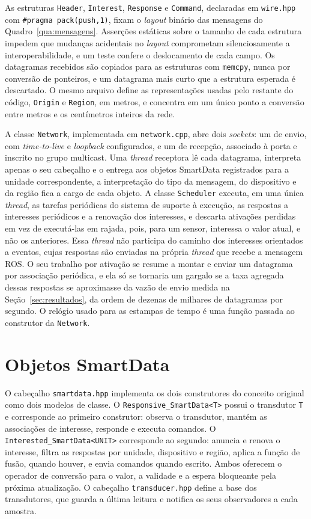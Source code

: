 \documentclass[
    12pt,
    oneside,
    a4paper,
    chapter=TITLE,
    section=TITLE,
    english,
    brazil
]{abntex2}
\begin{document}
As estruturas \texttt{Header}, \texttt{Interest}, \texttt{Response} e
\texttt{Command}, declaradas em \texttt{wire.hpp} com
\texttt{\#pragma pack(push,1)}, fixam o \textit{layout} binário das
mensagens do Quadro~\ref{qua:mensagens}. Asserções estáticas sobre o
tamanho de cada estrutura impedem que mudanças acidentais no
\textit{layout} comprometam silenciosamente a interoperabilidade, e um
teste confere o deslocamento de cada campo. Os datagramas recebidos são
copiados para as estruturas com \texttt{memcpy}, nunca por conversão de
ponteiros, e um datagrama mais curto que a estrutura esperada é descartado.
O mesmo arquivo define as representações usadas pelo restante do código,
\texttt{Origin} e \texttt{Region}, em metros, e concentra em um único
ponto a conversão entre metros e os centímetros inteiros da rede.

A classe \texttt{Network}, implementada em \texttt{network.cpp}, abre
dois \textit{sockets}: um de envio, com \textit{time-to-live} e
\textit{loopback} configurados, e um de recepção, associado à porta e
inscrito no grupo multicast. Uma \textit{thread} receptora lê cada
datagrama, interpreta apenas o seu cabeçalho e o entrega aos objetos
SmartData registrados para a unidade correspondente, a interpretação do
tipo da mensagem, do dispositivo e da região fica a cargo de cada objeto.
A classe \texttt{Scheduler} executa, em uma única \textit{thread}, as
tarefas periódicas do sistema de suporte à execução, as respostas a
interesses periódicos e a renovação dos interesses, e descarta ativações
perdidas em vez de executá-las em rajada, pois, para um sensor, interessa
o valor atual, e não os anteriores. Essa \textit{thread} não participa
do caminho dos interesses orientados a eventos, cujas respostas são
enviadas na própria \textit{thread} que recebe a mensagem ROS. O seu
trabalho por ativação se resume a montar e enviar um datagrama por
associação periódica, e ela só se tornaria um gargalo se a taxa agregada
dessas respostas se aproximasse da vazão de envio medida na
Seção~\ref{sec:resultados}, da ordem de dezenas de milhares de
datagramas por segundo. O relógio usado para as estampas de
tempo é uma função passada ao construtor da \texttt{Network}.

\section{Objetos SmartData}
\label{sec:sdimpl}

O cabeçalho \texttt{smartdata.hpp} implementa os dois construtores do
conceito original como dois modelos de classe. O
\texttt{Responsive\_SmartData<T>} possui o transdutor \texttt{T} e
corresponde ao primeiro construtor: observa o transdutor, mantém as
associações de interesse, responde e executa comandos. O
\texttt{Interested\_SmartData<UNIT>} corresponde ao segundo: anuncia e
renova o interesse, filtra as respostas por unidade, dispositivo e região,
aplica a função de fusão, quando houver, e envia comandos quando escrito.
Ambos oferecem o operador de conversão para o valor, a validade e a
espera bloqueante pela próxima atualização. O cabeçalho
\texttt{transducer.hpp} define a base dos transdutores, que guarda a
última leitura e notifica os seus observadores a cada amostra.
\end{document}
